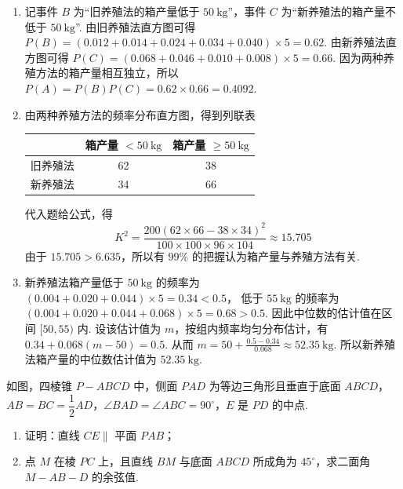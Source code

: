 \begin{solution}
\begin{enumerate}
\item 记事件 \(B\) 为“旧养殖法的箱产量低于 \(50\mathrm{~kg}\)”，事件 \(C\) 为“新养殖法的箱产量不低于 \(50\mathrm{~kg}\)”. 由旧养殖法直方图可得
\(P(B)=(0.012+0.014+0.024+0.034+0.040)\times5=0.62\).
由新养殖法直方图可得
\(P(C)=(0.068+0.046+0.010+0.008)\times5=0.66\).
因为两种养殖方法的箱产量相互独立，所以
\(P(A)=P(B)P(C)=0.62\times0.66=0.4092\).

\item 由两种养殖方法的频率分布直方图，得到列联表

\begin{center}
\begin{tabular}{c|cc}
& 箱产量 \(<50\mathrm{~kg}\) & 箱产量 \(\ge 50\mathrm{~kg}\)\\
\hline
旧养殖法 & 62 & 38\\
新养殖法 & 34 & 66
\end{tabular}
\end{center}

代入题给公式，得
\[
K^2=\frac{200(62\times66-38\times34)^2}{100\times100\times96\times104}\approx15.705
\]
由于 \(15.705>6.635\)，所以有 \(99\%\) 的把握认为箱产量与养殖方法有关.

\item 新养殖法箱产量低于 \(50\mathrm{~kg}\) 的频率为
\((0.004+0.020+0.044)\times5=0.34<0.5\)，
低于 \(55\mathrm{~kg}\) 的频率为
\((0.004+0.020+0.044+0.068)\times5=0.68>0.5\).
因此中位数的估计值在区间 \([50,55)\) 内. 设该估计值为 \(m\)，按组内频率均匀分布估计，有
\(0.34+0.068(m-50)=0.5\).
从而
\(m=50+\frac{0.5-0.34}{0.068}\approx52.35\mathrm{~kg}\).
所以新养殖法箱产量的中位数估计值为 \(52.35\mathrm{~kg}\).
\end{enumerate}
\end{solution}

\begin{problem}
如图，四棱锥 \(P-ABCD\) 中，侧面 \(PAD\) 为等边三角形且垂直于底面 \(ABCD\)，\(AB=BC=\dfrac12AD\)，\(\angle BAD=\angle ABC=90^\circ\)，\(E\) 是 \(PD\) 的中点.

\begin{enumerate}
\item 证明：直线 \(CE\parallel\) 平面 \(PAB\)；
\item 点 \(M\) 在棱 \(PC\) 上，且直线 \(BM\) 与底面 \(ABCD\) 所成角为 \(45^\circ\)，求二面角 \(M-AB-D\) 的余弦值.
\end{enumerate}

\end{problem}

